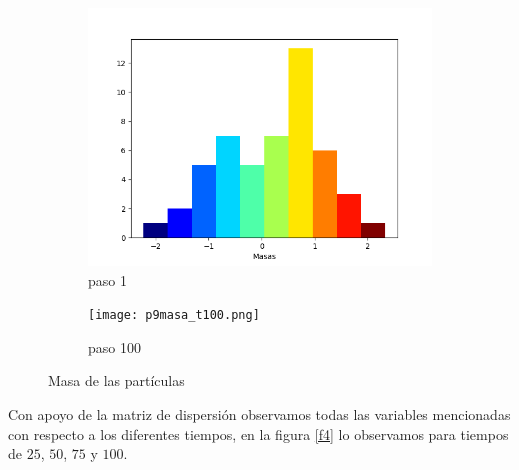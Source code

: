 \documentclass{article}
\begin{document}
\begin{figure}[H]
       \centering
       \begin{subfigure}[b]{0.60\linewidth}
           \includegraphics[width=\linewidth]{p9masa_t001.png}
           \caption{paso 1}
           \label{f1.a}
        \end{subfigure}
 \begin{subfigure}[b]{0.60\linewidth}
           \texttt{[image: p9masa\_t100.png]}
           \caption{paso 100}
           \label{f1.b}
        \end{subfigure}
\caption{Masa de las part\'iculas}
        \label{f3}
\end{figure}


Con apoyo de la matriz de dispersi\'on observamos todas las variables mencionadas con respecto a los diferentes tiempos, en la figura  \ref{f4} lo observamos para tiempos de $25$, $50$, $75$ y $100$.
\end{document}
